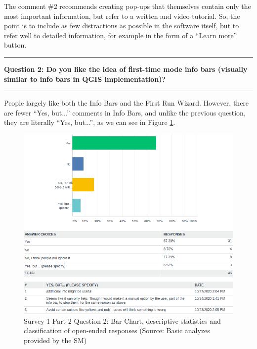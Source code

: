 \documentclass[a4paper,10pt,twoside]{article}
\begin{document}
\noindent The comment \#2 recommends creating pop-ups that themselves
contain only the most important information, but refer to a written
and video tutorial. So, the point is to include as few distractions as
possible in the software itself, but to refer well to detailed
information, for example in the form of a ``Learn more'' button.

\par\noindent\rule{\textwidth}{0.4pt}
\noindent \textbf{Question 2: Do you like the idea of first-time mode info bars (visually similar to info bars in QGIS implementation)?}
\par\noindent\rule{\textwidth}{0.4pt}

\noindent People largely like both the Info Bars and the First Run Wizard. However, there are fewer ``Yes, but...'' comments in Info Bars, and unlike the previous question, they are literally ``Yes, but...'', as we can see in Figure \ref{fig:survey1_part2_question2_all}. 

\vspace{0.3cm}
\begin{figure}[hbt!] 
\begin{center}
\includegraphics[width=15.5cm]{../surveys/analyzed_data/survey1_part2_question2_all.png} 
\caption[Survey 1 Part 2 Question 2: Bar Chart descriptive statistics and classification of open-ended responses]{Survey 1 Part 2 Question 2: Bar Chart, descriptive statistics and classification of  open-ended responses (Source: Basic analyzes provided by the SM)}
\label{fig:survey1_part2_question2_all}
\end{center}
\end{figure}
\end{document}
